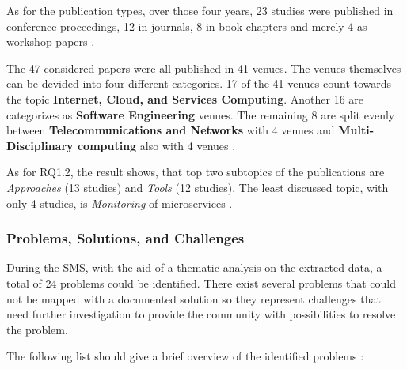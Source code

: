As for the publication types, over those four years, 23 studies
were published in conference proceedings, 12 in journals, 8 in book chapters
and merely 4 as workshop papers \cite{waseem:SMSMSADevOps}.

The 47 considered papers were all published in 41 venues. The venues
themselves can be devided into four different categories. 17 of the 41
venues count towards the topic \textbf{Internet, Cloud, and Services Computing}.
Another 16 are categorizes as \textbf{Software Engineering} venues. The remaining
8 are split evenly between \textbf{Telecommunications and Networks} with 4 venues
and \textbf{Multi-Disciplinary computing} also with 4 venues \cite{waseem:SMSMSADevOps}.

As for RQ1.2, the result shows, that top two subtopics of the publications
are \textit{Approaches} (13 studies) and \textit{Tools} (12 studies).
The least discussed topic, with only 4 studies, is \textit{Monitoring}
of microservices \cite{waseem:SMSMSADevOps}.


\subsubsection{Problems, Solutions, and Challenges}

During the SMS, with the aid of a thematic analysis on the
extracted data, a total of 24 problems could be identified.
There exist several problems that could not be mapped with a documented
solution so they represent challenges that need further investigation
to provide the community with possibilities to resolve the problem.

The following list should give a brief overview of the identified
problems \cite{waseem:SMSMSADevOps}:

